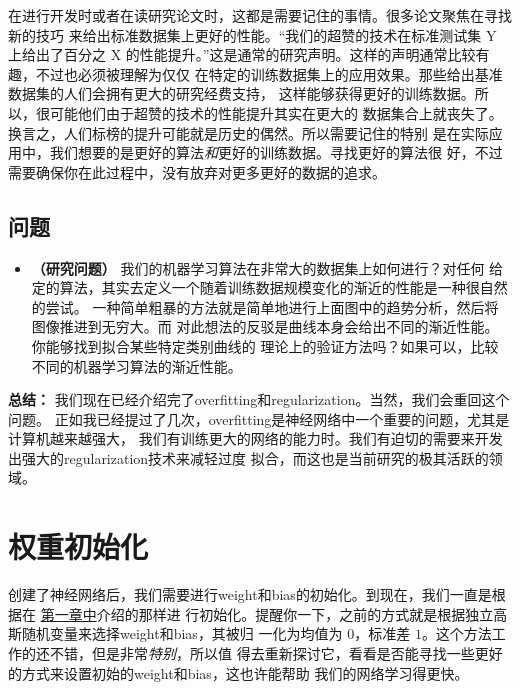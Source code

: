 在进行开发时或者在读研究论文时，这都是需要记住的事情。很多论文聚焦在寻找新的技巧
来给出标准数据集上更好的性能。“我们的超赞的技术在标准测试集 Y 上给出了百分之 X
的性能提升。”这是通常的研究声明。这样的声明通常比较有趣，不过也必须被理解为仅仅
在特定的训练数据集上的应用效果。那些给出基准数据集的人们会拥有更大的研究经费支持，
这样能够获得更好的训练数据。所以，很可能他们由于超赞的技术的性能提升其实在更大的
数据集合上就丧失了。换言之，人们标榜的提升可能就是历史的偶然。所以需要记住的特别
是在实际应用中，我们想要的是更好的算法\emph{和}更好的训练数据。寻找更好的算法很
好，不过需要确保你在此过程中，没有放弃对更多更好的数据的追求。

\subsection*{问题}

\begin{itemize}
\item \textbf{（研究问题）} 我们的机器学习算法在非常大的数据集上如何进行？对任何
  给定的算法，其实去定义一个随着训练数据规模变化的渐近的性能是一种很自然的尝试。
  一种简单粗暴的方法就是简单地进行上面图中的趋势分析，然后将图像推进到无穷大。而
  对此想法的反驳是曲线本身会给出不同的渐近性能。你能够找到拟合某些特定类别曲线的
  理论上的验证方法吗？如果可以，比较不同的机器学习算法的渐近性能。
\end{itemize}

\textbf{总结：} 我们现在已经介绍完了\gls*{overfitting}和\gls*{regularization}。当然，我们会重回这个问题。
正如我已经提过了几次，\gls*{overfitting}是神经网络中一个重要的问题，尤其是计算机越来越强大，
我们有训练更大的网络的能力时。我们有迫切的需要来开发出强大的\gls*{regularization}技术来减轻过度
拟合，而这也是当前研究的极其活跃的领域。

\section{权重初始化}
\label{sec:weight_initialization}

创建了神经网络后，我们需要进行\gls*{weight}和\gls*{bias}的初始化。到现在，我们一直是根据在%
\hyperref[ch:UsingNeuralNetsToRecognizeHandwrittenDigits]{第一章中}介绍的那样进
行初始化。提醒你一下，之前的方式就是根据独立高斯随机变量来选择\gls*{weight}和\gls*{bias}，其被归
一化为均值为 $0$，标准差 $1$。这个方法工作的还不错，但是非常\emph{特别}，所以值
得去重新探讨它，看看是否能寻找一些更好的方式来设置初始的\gls*{weight}和\gls*{bias}，这也许能帮助
我们的网络学习得更快。

